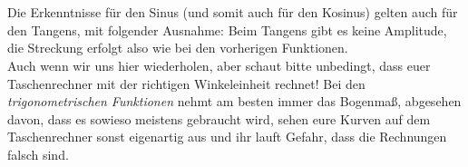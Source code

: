  			\formel{\[p=\frac{2\pi}{b}\]}
 			\\ \\
			 Die Erkenntnisse für den Sinus (und somit auch für den Kosinus) gelten auch
 			für den Tangens, mit folgender Ausnahme: Beim Tangens gibt es keine
 			Amplitude, die Streckung erfolgt also wie bei den vorherigen Funktionen.\\
 			Auch wenn wir uns hier wiederholen, aber schaut bitte unbedingt, dass euer
 			Taschenrechner mit der richtigen Winkeleinheit rechnet! Bei den
 			\textit{trigonometrischen Funktionen} nehmt am besten immer das Bogenmaß,
 			abgesehen davon, dass es sowieso meistens gebraucht wird, sehen eure Kurven
 			auf dem Taschenrechner sonst eigenartig aus und ihr lauft Gefahr, dass die
 			Rechnungen falsch sind.

